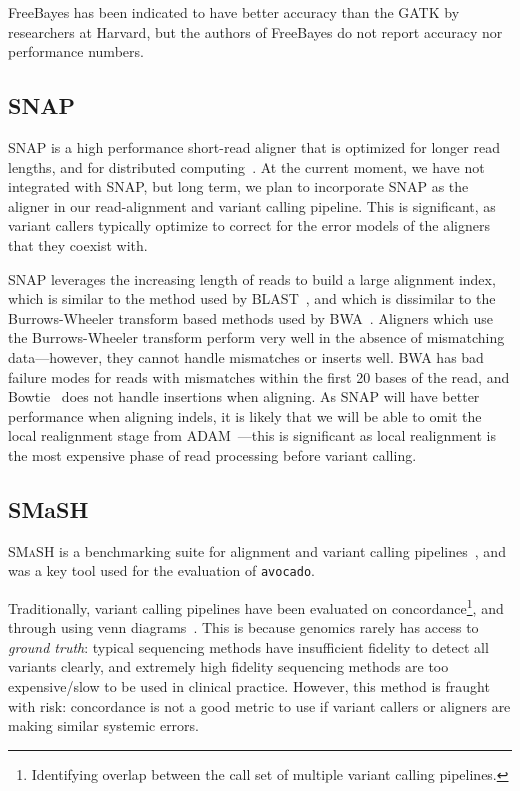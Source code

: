 \documentclass{acm_proc_article-sp}
\begin{document}
FreeBayes has been indicated to have better accuracy than the GATK by researchers at Harvard, but the authors of FreeBayes
do not report accuracy nor performance numbers.

\subsection{SNAP}
\label{sec:snap}


SNAP is a high performance short-read aligner that is optimized for longer read lengths, and for distributed computing~\cite{zaharia11}.
At the current moment, we have not integrated with SNAP, but long term, we plan to incorporate SNAP as the aligner in our read-alignment
and variant calling pipeline. This is significant, as variant callers typically optimize to correct for the error models of the aligners that they
coexist with.

SNAP leverages the increasing length of reads to build a large alignment index, which is similar to the method used by
BLAST~\cite{altschul90}, and which is dissimilar to the Burrows-Wheeler transform based methods used by BWA~\cite{li09bwa}. Aligners
which use the Burrows-Wheeler transform perform very well in the absence of mismatching data---however, they cannot handle mismatches
or inserts well. BWA has bad failure modes for reads with mismatches within the first 20 bases of the read, and Bowtie~\cite{langmead09}
does not handle insertions when aligning. As SNAP will have better performance when aligning indels, it is likely that we will be able to
omit the local realignment stage from ADAM~\cite{massie13}---this is significant as local realignment is the most expensive phase of
read processing before variant calling.

\subsection{SMaSH}
\label{sec:smash}


\textsc{SMaSH} is a benchmarking suite for alignment and variant calling pipelines~\cite{talwalkar13}, and was a key tool used for the
evaluation of \texttt{avocado}.

Traditionally, variant calling pipelines have been evaluated on concordance\footnote{Identifying overlap between the call set of multiple
variant calling pipelines.}, and through using venn diagrams~\cite{tao13}. This is because genomics rarely has access to \emph{ground
truth}: typical sequencing methods have insufficient fidelity to detect all variants clearly, and extremely high fidelity sequencing methods
are too expensive/slow to be used in clinical practice. However, this method is fraught with risk: concordance is not a good metric to use if
variant callers or aligners are making similar systemic errors.
\end{document}
